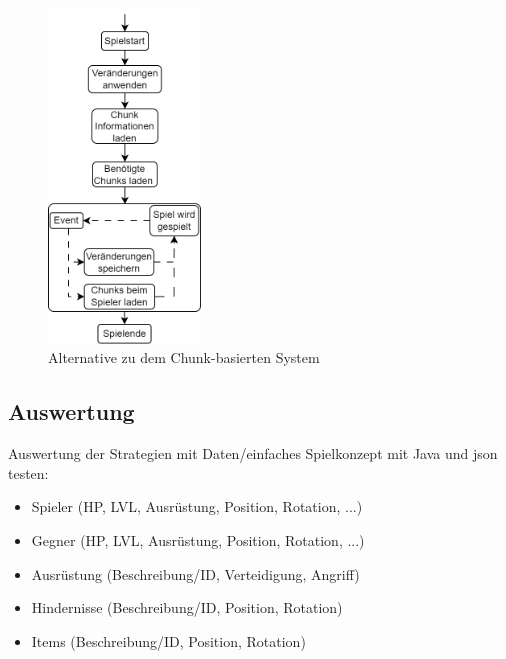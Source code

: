 \begin{figure}[htp]
    \centering
    \includegraphics[width=0.36\textwidth]{images/Chunkbasiert2.png}
    \caption{Alternative zu dem Chunk-basierten System}
    \label{fig:altchunkBasedSystem}
\end{figure}


\subsection{Auswertung}
Auswertung der Strategien mit Daten/einfaches Spielkonzept mit Java und \ac{json} testen:
\begin{itemize}
    \item Spieler (HP, LVL, Ausrüstung, Position, Rotation, ...)
    \item Gegner (HP, LVL, Ausrüstung, Position, Rotation, ...)
    \item Ausrüstung (Beschreibung/ID, Verteidigung, Angriff)
    \item Hindernisse (Beschreibung/ID, Position, Rotation)
    \item Items (Beschreibung/ID, Position, Rotation)
\end{itemize}

